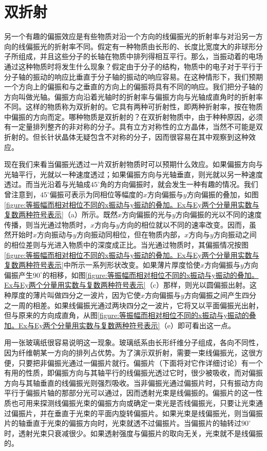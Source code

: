 \section{双折射}

另一个有趣的偏振效应是有些物质对沿一个方向的线偏振光的折射率与对沿另一方向的线偏振光的折射率不同。假定有一种物质由长形的、长度比宽度大的非球形分子所组成，并且这些分子的长轴在物质中排列得相互平行。那么，当振动着的电场通过这种物质时将发生什么现象？假定由于分子的结构，物质中的电子对于平行于分子轴的振动的响应比垂直于分子轴的振动的响应容易。在这种情形下，我们预期一个方向上的偏振和与之垂直的方向上的偏振将具有不同的响应。我们把分子轴的方向叫做光轴。偏振方向沿着光轴时的折射率与偏振方向与光轴成直角时的折射率不同。这样的物质称为双折射的。它具有两种可折射性，即两种折射率，按在物质中偏振的方向而定。哪种物质是双折射的？在双折射物质中，由于种种原因，必须有一定量排列整齐的非对称的分子。具有立方对称性的立方晶体，当然不可能是双折射的。但长针状晶体无疑包含不对称的分子，因而很容易在其中观察到这种效应。

现在我们来看当偏振光透过一片双折射物质时可以预期什么效应。如果偏振方向与光轴平行，光就以一种速度透过；如果偏振方向与光轴垂直，则光就以另一种速度透过。而当光沿着与光轴成$45^\circ$角的方向偏振时，就会发生一种有趣的情况。我们曾注意到，$45^\circ$偏振可表示为同相位等幅度的$x$方向偏振与$y$方向偏振的叠加，如图\ref{figure:等振幅而相对相位不同的x振动与y振动的叠加。Ex与Ey两个分量用实数与复数两种符号表示}（a）所示。既然$x$方向偏振的光与$y$方向偏振的光以不同的速度传播，则当光通过物质时，$x$方向与$y$方向的相位就以不同的速率改变。因而，虽然开始时$x$方向振动与$y$方向振动同相位，但在物质内部，$x$方向与$y$方向振动之间的相位差则与光进入物质中的深度成正比。当光通过物质时，其偏振情况按图\ref{figure:等振幅而相对相位不同的x振动与y振动的叠加。Ex与Ey两个分量用实数与复数两种符号表示}中所示一系列形状改变。如果薄片厚度恰使$x$方向偏振与$y$方向偏振产生$90^\circ$的相移，如图\ref{figure:等振幅而相对相位不同的x振动与y振动的叠加。Ex与Ey两个分量用实数与复数两种符号表示}（c）那样，则光以圆偏振出射。这种厚度的薄片叫做四分之一波片，因为它使$x$方向偏振与$y$方向偏振之间产生四分之一周的相差。如果线偏振光通过两块四分之一波片，它将又以平面偏振光出射，但与原来的方向成直角，从图\ref{figure:等振幅而相对相位不同的x振动与y振动的叠加。Ex与Ey两个分量用实数与复数两种符号表示}（e）即可看出这一点。

用一张玻璃纸很容易说明这一现象。玻璃纸系由长形纤维分子组成，各向不同性，因为纤维朝某一方向的排列占优势。为了演示双折射，需要一束线偏振光，这很方便，只要把非偏振光通过一偏振片就行。偏振片（下面将对它作详细讨论）有一个有用的性质，即偏振方向与其轴平行的线偏振光透过它时，很少被吸收，而对偏振方向与其轴垂直的线偏振光则强烈吸收。当非偏振光通过偏振片时，只有振动方向平行于偏振片轴的那部分光可以通过，因而透射光束是线偏振的。偏振片的这一性质也可用来探测线偏振光束的偏振方向或确定一束光是否线偏振光，只要让光束通过偏振片，并在垂直于光束的平面内旋转偏振片。如果光束是线偏振光，则当偏振片的轴垂直于光束的偏振方向时，光束就透不过偏振片。当偏振片的轴转过$90^\circ$时，透射光束只衰减很少。如果透射强度与偏振片的取向无关，光束就不是线偏振的。

